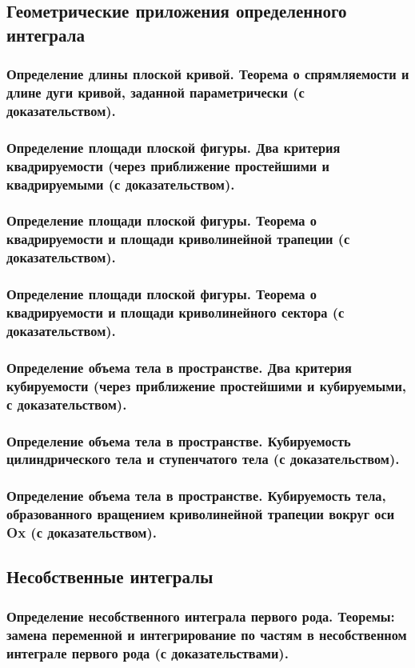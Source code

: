 \documentclass[10pt]{article}
\begin{document}
    \subsection{Геометрические приложения определенного интеграла}
    \subsubsection{Определение длины плоской кривой. Теорема о спрямляемости и длине дуги кривой, заданной параметрически (с доказательством).}
    \subsubsection{Определение площади плоской фигуры. Два критерия квадрируемости (через приближение простейшими и квадрируемыми (с доказательством).}
    \subsubsection{Определение площади плоской фигуры. Теорема о квадрируемости и площади криволинейной трапеции (с доказательством).}
    \subsubsection{Определение площади плоской фигуры. Теорема о квадрируемости и площади криволинейного сектора (с доказательством).}
    \subsubsection{Определение объема тела в пространстве. Два критерия кубируемости (через приближение простейшими и кубируемыми, с доказательством).}
    \subsubsection{Определение объема тела в пространстве. Кубируемость цилиндрического тела и ступенчатого тела (с доказательством).}
    \subsubsection{Определение объема тела в пространстве. Кубируемость тела, образованного вращением криволинейной трапеции вокруг оси Ox (с доказательством).}
    \subsection{Несобственные интегралы}
    \subsubsection{Определение несобственного интеграла первого рода. Теоремы: замена переменной и интегрирование по частям в несобственном интеграле первого рода (с доказательствами).}
\end{document}
